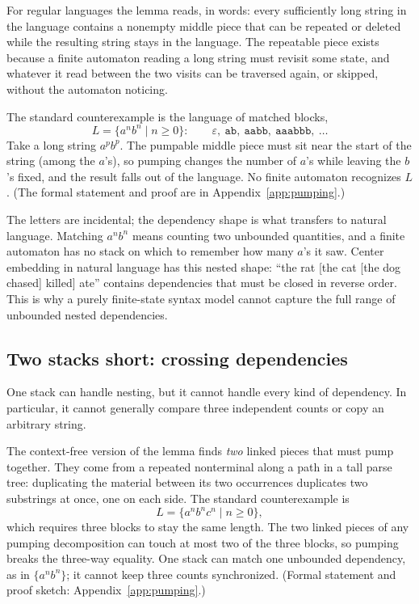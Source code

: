 \documentclass[11pt]{article}
\theoremstyle{definition}
\theoremstyle{plain}
\theoremstyle{remark}
\newcommand{\eps}{\varepsilon}
\begin{document}
For regular languages the lemma reads, in words: every sufficiently long string
in the language contains a nonempty middle piece that can be repeated or deleted
while the resulting string stays in the language. The repeatable piece exists
because a finite automaton reading a long string must revisit some state, and
whatever it read between the two visits can be traversed again, or skipped,
without the automaton noticing.

The standard counterexample is the language of matched blocks,
\[
    L = \{a^n b^n \mid n \ge 0\}: \qquad
    \eps,\ \texttt{ab},\ \texttt{aabb},\ \texttt{aaabbb},\ \ldots
\]
Take a long string $a^p b^p$. The pumpable middle piece must sit near the start
of the string (among the $a$'s), so pumping changes the number of $a$'s
while leaving the $b$'s fixed, and the result falls out of the language. No
finite automaton recognizes $L$. (The formal statement and proof are in
Appendix~\ref{app:pumping}.)

The letters are incidental; the dependency shape is what transfers to natural
language. Matching $a^n b^n$ means counting two unbounded quantities, and a finite
automaton has no stack on which to remember how many $a$'s it saw. Center
embedding in natural language has this nested shape: ``the rat [the cat [the
dog chased] killed] ate'' contains dependencies that must be closed in reverse
order. This is why a purely finite-state syntax model cannot capture the full
range of unbounded nested dependencies.

\subsection{Two stacks short: crossing dependencies}

One stack can handle nesting, but it cannot handle every kind of dependency. In
particular, it cannot generally compare three independent counts or copy an
arbitrary string.

The context-free version of the lemma finds \emph{two} linked pieces that must
pump together. They come from a repeated nonterminal along a path in a tall
parse tree: duplicating the material between its two occurrences duplicates two
substrings at once, one on each side. The standard counterexample is
\[
    L = \{a^n b^n c^n \mid n \ge 0\},
\]
which requires three blocks to stay the same length. The two linked pieces of
any pumping decomposition can touch at most two of the three blocks, so pumping
breaks the three-way equality. One stack can match one unbounded dependency, as
in $\{a^n b^n\}$; it cannot keep three counts synchronized. (Formal statement
and proof sketch: Appendix~\ref{app:pumping}.)
\end{document}
